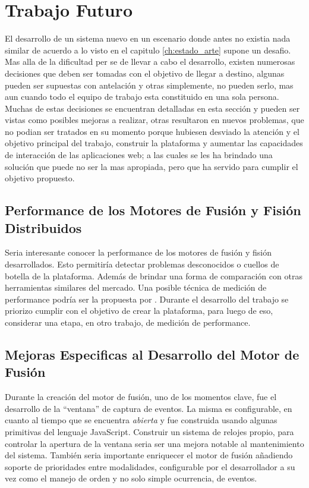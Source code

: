 \section{Trabajo Futuro} \label{sec:end_future}
El desarrollo de un sistema nuevo en un escenario donde antes no existia nada similar de acuerdo a lo visto en el capitulo \ref{ch:estado_arte} supone un desafio. Mas alla de la dificultad per se de llevar a cabo el desarrollo, existen numerosas decisiones que deben ser tomadas con el objetivo de llegar a destino, algunas pueden ser supuestas con antelación y otras simplemente, no pueden serlo, mas aun cuando todo el equipo de trabajo esta constituido en una sola persona. Muchas de estas decisiones se encuentran detalladas en esta sección y pueden ser vistas como posibles mejoras a realizar, otras resultaron en nuevos problemas, que no podian ser tratados en su momento porque hubiesen desviado la atención y el objetivo principal del trabajo, construir la plataforma y aumentar las capacidades de interacción de las aplicaciones web; a las cuales se les ha brindado una solución que puede no ser la mas apropiada, pero que ha servido para cumplir el objetivo propuesto.

\subsection{Performance de los Motores de Fusión y Fisión Distribuidos}
Seria interesante conocer la performance de los motores de fusión y fisión desarrollados. Esto permitiría detectar problemas desconocidos o cuellos de botella de la plataforma. Además de brindar una forma de comparación con otras herramientas similares del mercado. Una posible técnica de medición de performance podría ser la propuesta por \citet{dumas2009benchmarking}. Durante el desarrollo del trabajo se priorizo cumplir con el objetivo de crear la plataforma, para luego de eso, considerar una etapa, en otro trabajo, de medición de performance.

\subsection{Mejoras Especificas al Desarrollo del Motor de Fusión}
Durante la creación del motor de fusión, uno de los momentos clave, fue el desarrollo de la ``ventana'' de captura de eventos. La misma es configurable, en cuanto al tiempo que se encuentra \textit{abierta} y fue construida usando algunas primitivas del lenguaje JavaScript. Construir un sistema de relojes propio, para controlar la apertura de la ventana seria ser una mejora notable al mantenimiento del sistema. También seria importante enriquecer el motor de fusión añadiendo soporte de prioridades entre modalidades, configurable por el desarrollador a su vez como el manejo de orden y no solo simple ocurrencia, de eventos.

